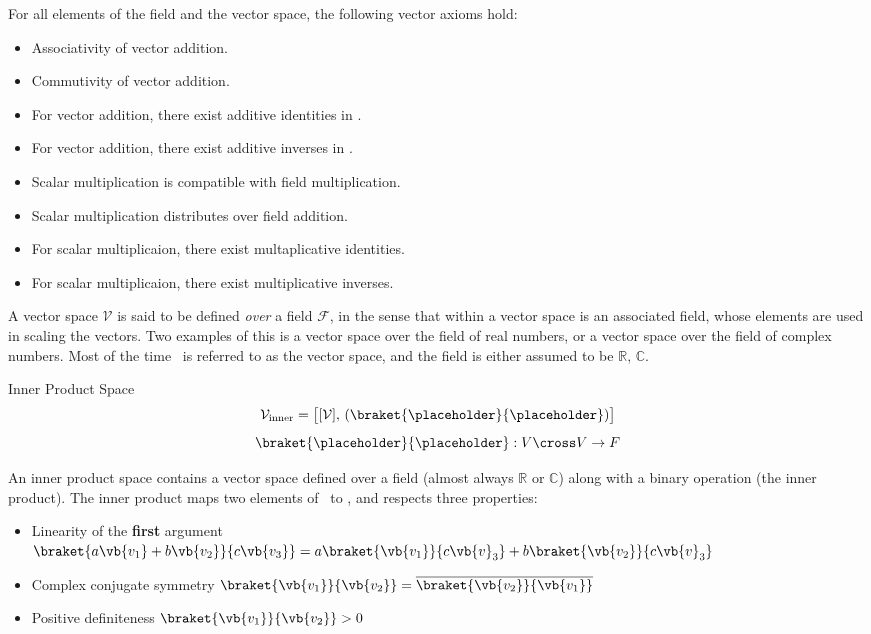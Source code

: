 For all elements of the field and the vector space, the following vector axioms hold:

\begin{itemize}
	\item Associativity of vector addition.
	\item Commutivity of vector addition.
	\item For vector addition, there exist additive identities in \Vset.
	\item For vector addition, there exist additive inverses in \Vset.
	\item Scalar multiplication is compatible with field multiplication.
	\item Scalar multiplication distributes over field addition. 
	\item For scalar multiplicaion, there exist multaplicative identities.
	\item For scalar multiplicaion, there exist multiplicative inverses.
\end{itemize}
A vector space \(\mathcal{V}\) is said to be defined \textit{over} a field \(\mathcal{F}\), in the sense that within a vector space is an associated field, whose elements are used in scaling the vectors. Two examples of this is a vector space over the field of real numbers, or a vector space over the field of complex numbers. Most of the time \Vset\ is referred to as the vector space, and the field is either assumed to be \(\mathbb{R},\,\mathbb{C}\).
\newpage
\begin{mathbox}{Inner Product Space}
	\begin{equation*}
		\mathcal{V}_{\rm inner}=\big[[\mathcal{V}],\,(\braket{\placeholder}{\placeholder})\big]
	\end{equation*}
	\begin{equation*}
	\braket{\placeholder}{\placeholder}: V\cross V\rightarrow F
\end{equation*}
\end{mathbox}
An inner product space contains a vector space defined over a field (almost always \(\mathbb{R}\) or \(\mathbb{C}\)) along with a binary operation (the inner product). 
The inner product maps two elements of \Vset\ to \Fset, and respects three properties:
\begin{itemize}
	\item Linearity of the \textbf{first} argument \(\braket{a\vb{v_1}+b\vb{v_2}}{c\vb{v_3}}=a\braket{\vb{v_1}}{c\vb{v}_3}+b\braket{\vb{v_2}}{c\vb{v}_3}\)
	\item Complex conjugate symmetry \(\braket{\vb{v_1}}{\vb{v_2}}=\overline{\braket{\vb{v_2}}{\vb{v_1}}}\)
	\item Positive definiteness \(\braket{\vb{v_1}}{\vb{v_2}}>0\)
\end{itemize}
